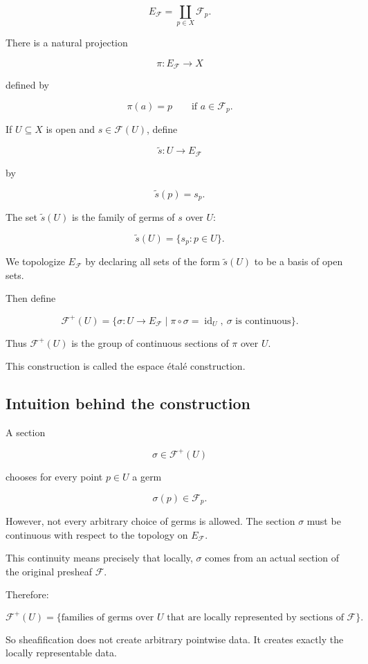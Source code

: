 \documentclass[12pt,a4paper]{article}
\DeclareMathOperator{\id}{id}
\theoremstyle{notespace}
\begin{document}
\[
E_{\mathcal F}
=
\coprod_{p \in X} \mathcal F_p.
\]

There is a natural projection

\[
\pi : E_{\mathcal F} \longrightarrow X
\]

defined by

\[
\pi(a)=p
\qquad
\text{if } a \in \mathcal F_p.
\]

If $U \subseteq X$ is open and $s \in \mathcal F(U)$, define

\[
\widetilde{s} : U \longrightarrow E_{\mathcal F}
\]

by

\[
\widetilde{s}(p)=s_p.
\]

The set $\widetilde{s}(U)$ is the family of germs of $s$ over $U$:

\[
\widetilde{s}(U)
=
\{s_p : p \in U\}.
\]

We topologize $E_{\mathcal F}$ by declaring all sets of the form
$\widetilde{s}(U)$ to be a basis of open sets.

Then define

\[
\mathcal F^+(U)
=
\{\sigma : U \to E_{\mathcal F}
\mid
\pi \circ \sigma = \id_U,
\ \sigma \text{ is continuous}\}.
\]

Thus $\mathcal F^+(U)$ is the group of continuous sections of $\pi$ over $U$.

This construction is called the espace \'{e}tal\'{e} construction.

\subsection{Intuition behind the construction}
A section

\[
\sigma \in \mathcal F^+(U)
\]

chooses for every point $p \in U$ a germ

\[
\sigma(p) \in \mathcal F_p.
\]

However, not every arbitrary choice of germs is allowed.
The section $\sigma$ must be continuous with respect to the topology on
$E_{\mathcal F}$.

This continuity means precisely that locally, $\sigma$ comes from an actual
section of the original presheaf $\mathcal F$.

Therefore:

\[
\boxed{
	\mathcal F^+(U)
	=
	\{
	\text{families of germs over } U
	\text{ that are locally represented by sections of } \mathcal F
	\}.
}
\]

So sheafification does not create arbitrary pointwise data.
It creates exactly the locally representable data.
\end{document}

